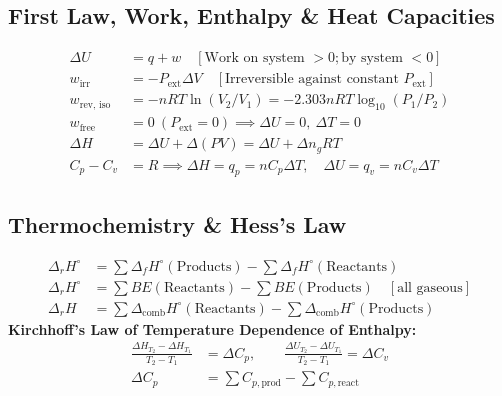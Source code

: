 \documentclass[10pt,twoside,openright]{book}
\begin{document}
\subsection{First Law, Work, Enthalpy \& Heat Capacities}

\begin{formulabox}
\begin{align}
  \Delta U &= q + w \quad [\text{Work on system } > 0; \text{by system } < 0] \\
  w_{\text{irr}} &= -P_{\text{ext}}\Delta V \quad [\text{Irreversible against constant } P_{\text{ext}}] \\
  w_{\text{rev, iso}} &= -n R T \ln(V_2/V_1) = -2.303 n R T \log_{10}(P_1/P_2) \\
  w_{\text{free}} &= 0 \ (P_{\text{ext}} = 0) \implies \Delta U = 0, \ \Delta T = 0 \\
  \Delta H &= \Delta U + \Delta(P V) = \Delta U + \Delta n_g R T \\
  C_p - C_v &= R \implies \Delta H = q_p = n C_p \Delta T, \quad \Delta U = q_v = n C_v \Delta T
\end{align}
\end{formulabox}

\subsection{Thermochemistry \& Hess's Law}

\begin{formulabox}
\begin{align}
  \Delta_r H^\circ &= \sum \Delta_f H^\circ(\text{Products}) - \sum \Delta_f H^\circ(\text{Reactants}) \\
  \Delta_r H^\circ &= \sum BE(\text{Reactants}) - \sum BE(\text{Products}) \quad [\text{all gaseous}] \\
  \Delta_r H &= \sum \Delta_{\text{comb}} H^\circ(\text{Reactants}) - \sum \Delta_{\text{comb}} H^\circ(\text{Products})
\end{align}
\textbf{Kirchhoff's Law of Temperature Dependence of Enthalpy:}
\begin{align}
  \frac{\Delta H_{T_2} - \Delta H_{T_1}}{T_2 - T_1} &= \Delta C_p, \qquad \frac{\Delta U_{T_2} - \Delta U_{T_1}}{T_2 - T_1} = \Delta C_v \\
  \Delta C_p &= \sum C_{p,\text{prod}} - \sum C_{p,\text{react}}
\end{align}
\end{formulabox}
\end{document}
